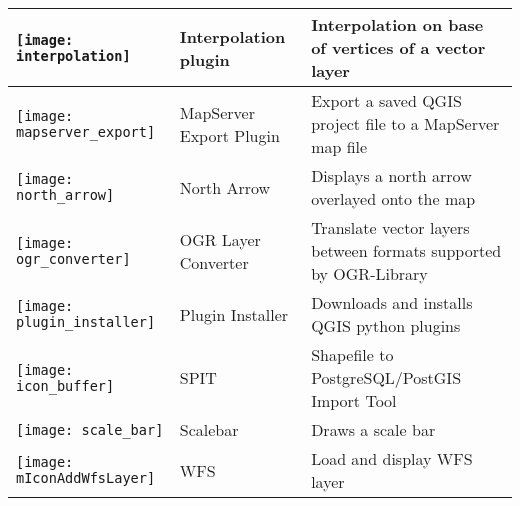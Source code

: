 \begin{minipage}{\textwidth}
\begin{table}[H]
\begin{tabular}{|l|l|p{4in}|}
\hline
\texttt{[image: interpolation]}
& Interpolation plugin \index{plugins!Interpolation}& Interpolation on base of vertices of a vector layer\\
\hline
\texttt{[image: mapserver\_export]}
& MapServer Export Plugin \index{plugins!MapServer Export}& Export a saved QGIS project file to a MapServer map file \\
\hline
\texttt{[image: north\_arrow]}
& North Arrow \index{plugins!north arrow}& Displays a north arrow overlayed onto the map\\
\hline
\texttt{[image: ogr\_converter]}
 & OGR Layer Converter \index{plugins!OGR converter} & Translate vector layers between formats supported by OGR-Library\\
\hline
\texttt{[image: plugin\_installer]}
 & Plugin Installer \index{plugins!Plugin Installer} & Downloads and installs QGIS python plugins\\
\hline
\texttt{[image: icon\_buffer]}
 & SPIT \index{plugins!spit}& Shapefile to PostgreSQL/PostGIS Import Tool \\
\hline
\texttt{[image: scale\_bar]}
 & Scalebar \index{plugins!scalebar}& Draws a scale bar\\
\hline
\texttt{[image: mIconAddWfsLayer]}
 & WFS & Load and display WFS layer \\
\hline
\end{tabular}
\end{table}
\end{minipage}

\normalsize

\begin{Tip}\caption{\textsc{Plugins Settings Saved to Project}}
\end{Tip}
